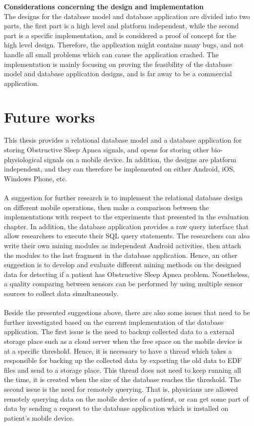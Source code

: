 \textbf{Considerations concerning the design and implementation}\\
The designs for the database model and database application are divided into two parts, the first part is a high level and platform independent, while the second part is a specific implementation, and is considered a proof of concept for the high level design. Therefore, the application might contains many bugs, and not handle all small problems which can cause the application crashed. The implementation is mainly focusing on proving the feasibility of the database model and database application designs, and is far away to be a commercial application.
\section{Future works}
This thesis provides a relational database model and a database application for storing Obstructive Sleep Apnea signals, and opens for storing other bio-physiological signals on a mobile device. In addition, the designs are platform independent, and they can therefore be implemented on either Android, iOS, Windows Phone, etc.\\\\
A suggestion for further research is to implement the relational database design on different mobile operations, then make a comparison between the implementations with respect to the experiments that presented in the evaluation chapter. In addition, the database application provides a raw query interface that allow researchers to execute their SQL query statements. The researchers can also write their own mining modules as independent Android activities, then attach the modules to the last fragment in the database application. Hence, an other suggestion is to develop and evaluate different mining methods on the designed data for detecting if a patient has Obstructive Sleep Apnea problem. Nonetheless, a quality comparing between sensors can be performed by using multiple sensor sources to collect data simultaneously.\\\\
Beside the presented suggestions above, there are also some issues that need to be further investigated based on the current implementation of the database application. The first issue is the need to backup collected data to a external storage place such as a cloud server when the free space on the mobile device is at a specific threshold. Hence, it is necessary to have a thread which takes a responsible for backing up the collected data by exporting the old data to EDF files and send to a storage place. This thread does not need to keep running all the time, it is created when the size of the database reaches the threshold. The second issue is the need for remotely querying. That is, physicians are allowed remotely querying data on the mobile device of a patient, or can get some part of data by sending a request to the database application which is installed on patient's mobile device.\\
